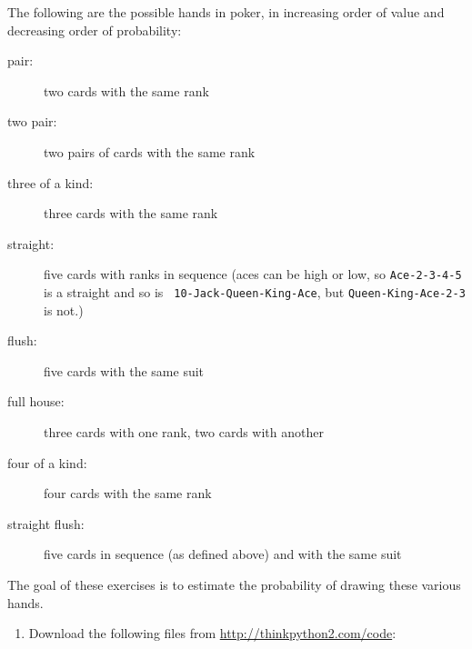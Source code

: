 \documentclass[10pt]{book}
\begin{document}
\begin{exercise}
\label{poker}

The following are the possible hands in poker, in increasing order
of value and decreasing order of probability:

\begin{description}

\item[pair:] two cards with the same rank
\vspace{-0.05in}

\item[two pair:] two pairs of cards with the same rank
\vspace{-0.05in}

\item[three of a kind:] three cards with the same rank
\vspace{-0.05in}

\item[straight:] five cards with ranks in sequence (aces can
be high or low, so {\tt Ace-2-3-4-5} is a straight and so is {\tt
10-Jack-Queen-King-Ace}, but {\tt Queen-King-Ace-2-3} is not.)
\vspace{-0.05in}

\item[flush:] five cards with the same suit
\vspace{-0.05in}

\item[full house:] three cards with one rank, two cards with another
\vspace{-0.05in}

\item[four of a kind:] four cards with the same rank
\vspace{-0.05in}

\item[straight flush:] five cards in sequence (as defined above) and
with the same suit
\vspace{-0.05in}

\end{description}
%
The goal of these exercises is to estimate
the probability of drawing these various hands.

\begin{enumerate}

\item Download the following files from \url{http://thinkpython2.com/code}:

\begin{description}


\end{description}
\end{enumerate}
\end{exercise}
\end{document}
